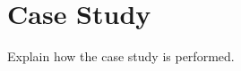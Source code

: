 \documentclass[main.tex]{subfiles}
\begin{document}
    
    \chapter{Case Study}
    Explain how the case study is performed.
\end{document}
